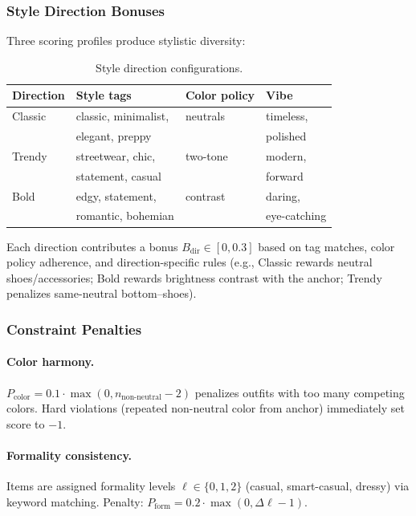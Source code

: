 \documentclass[10pt,twocolumn]{article}
\begin{document}
\subsubsection{Style Direction Bonuses}

Three scoring profiles produce stylistic diversity:

\begin{table}[h]
\centering
\small
\caption{Style direction configurations.}
\label{tab:directions}
\begin{tabular}{llll}
\toprule
Direction & Style tags & Color policy & Vibe \\
\midrule
Classic & classic, minimalist, & neutrals & timeless, \\
        & elegant, preppy & & polished \\
Trendy  & streetwear, chic, & two-tone & modern, \\
        & statement, casual & & forward \\
Bold    & edgy, statement, & contrast & daring, \\
        & romantic, bohemian & & eye-catching \\
\bottomrule
\end{tabular}
\end{table}

Each direction contributes a bonus $B_{\text{dir}} \in [0, 0.3]$ based on
tag matches, color policy adherence, and direction-specific rules (e.g.,
Classic rewards neutral shoes/accessories; Bold rewards brightness contrast
with the anchor; Trendy penalizes same-neutral bottom--shoes).

\subsubsection{Constraint Penalties}

\paragraph{Color harmony.}
$P_{\text{color}} = 0.1 \cdot \max(0, n_{\text{non-neutral}} - 2)$ penalizes
outfits with too many competing colors.  Hard violations (repeated
non-neutral color from anchor) immediately set score to $-1$.

\paragraph{Formality consistency.}
Items are assigned formality levels $\ell \in \{0, 1, 2\}$ (casual,
smart-casual, dressy) via keyword matching.  Penalty:
$P_{\text{form}} = 0.2 \cdot \max(0, \Delta\ell - 1)$.
\end{document}
